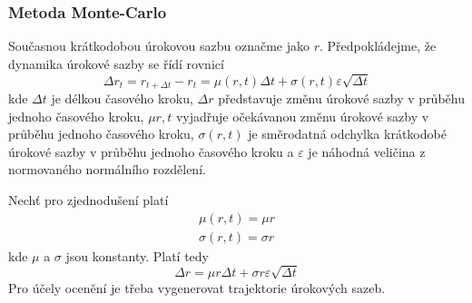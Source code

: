 \documentclass[a4paper]{book}
\begin{document}
\subsubsection{Metoda Monte-Carlo}

Současnou krátkodobou úrokovou sazbu označme jako $r$. Předpokládejme, že dynamika úrokové sazby se řídí rovnicí
\begin{equation*}
\Delta r_t = r_{t + \Delta t} - r_t = \mu(r,t)\Delta t + \sigma(r,t) \varepsilon \sqrt{\Delta t}
\end{equation*}
kde $\Delta t$ je délkou časového kroku, $\Delta r$ představuje změnu úrokové sazby v průběhu jednoho časového kroku, $\mu {r ,t}$ vyjadřuje očekávanou změnu úrokové sazby v průběhu jednoho časového kroku, $\sigma(r,t)$ je směrodatná odchylka krátkodobé úrokové sazby v průběhu jednoho časového kroku a $\varepsilon$ je náhodná veličina z normovaného normálního rozdělení.

Nechť pro zjednodušení platí
\begin{gather*}
\mu(r,t) = \mu r \\
\sigma(r,t) = \sigma r
\end{gather*}
kde $\mu$ a $\sigma$ jsou konstanty. Platí tedy
\begin{equation*}
\Delta r = \mu r \Delta t + \sigma r \varepsilon \sqrt{\Delta t}
\end{equation*}
Pro účely ocenění je třeba vygenerovat trajektorie úrokových sazeb.\\
\end{document}
